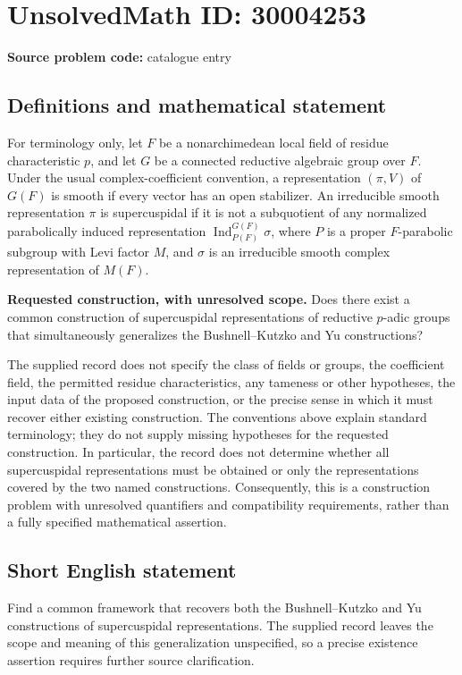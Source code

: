 \documentclass[11pt]{article}
\begin{document}
\section*{UnsolvedMath ID: 30004253}
\textbf{Source problem code:} catalogue entry
\subsection{Definitions and mathematical statement}
For terminology only, let \(F\) be a nonarchimedean local field of residue characteristic \(p\), and let \(G\) be a connected reductive algebraic group over \(F\). Under the usual complex-coefficient convention, a representation \((\pi,V)\) of \(G(F)\) is smooth if every vector has an open stabilizer. An irreducible smooth representation \(\pi\) is supercuspidal if it is not a subquotient of any normalized parabolically induced representation \(\operatorname{Ind}_{P(F)}^{G(F)}\sigma\), where \(P\) is a proper \(F\)-parabolic subgroup with Levi factor \(M\), and \(\sigma\) is an irreducible smooth complex representation of \(M(F)\).

\textbf{Requested construction, with unresolved scope.} Does there exist a common construction of supercuspidal representations of reductive \(p\)-adic groups that simultaneously generalizes the Bushnell--Kutzko and Yu constructions?

The supplied record does not specify the class of fields or groups, the coefficient field, the permitted residue characteristics, any tameness or other hypotheses, the input data of the proposed construction, or the precise sense in which it must recover either existing construction. The conventions above explain standard terminology; they do not supply missing hypotheses for the requested construction. In particular, the record does not determine whether all supercuspidal representations must be obtained or only the representations covered by the two named constructions. Consequently, this is a construction problem with unresolved quantifiers and compatibility requirements, rather than a fully specified mathematical assertion.
\subsection{Short English statement}
Find a common framework that recovers both the Bushnell--Kutzko and Yu constructions of supercuspidal representations. The supplied record leaves the scope and meaning of this generalization unspecified, so a precise existence assertion requires further source clarification.
\end{document}
